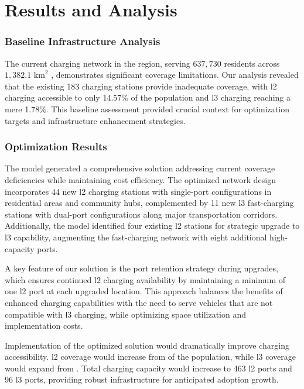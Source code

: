 \chapter{Results and Analysis}

\subsection*{Baseline Infrastructure Analysis}

The current charging network in the  region, serving $637,730$ residents \cite{statcan2021} across $1,382.1 \text{ km}^2$ \cite{statcan2021}, demonstrates significant coverage limitations. Our analysis revealed that the existing 183 charging stations \cite{ocm2024} provide inadequate coverage, with \gls{l2} charging accessible to only 14.57\% of the population and \gls{l3} charging reaching a mere 1.78\%. This baseline assessment provided crucial context for optimization targets and infrastructure enhancement strategies.

\subsection*{Optimization Results}

The  model generated a comprehensive solution addressing current coverage deficiencies while maintaining cost efficiency. The optimized network design incorporates 44 new \gls{l2} charging stations with single-port configurations in residential areas and community hubs, complemented by 11 new \gls{l3} fast-charging stations with dual-port configurations along major transportation corridors. Additionally, the model identified four existing \gls{l2} stations for strategic upgrade to \gls{l3} capability, augmenting the fast-charging network with eight additional high-capacity ports.

A key feature of our solution is the port retention strategy during upgrades, which ensures continued \gls{l2} charging availability by maintaining a minimum of one \gls{l2} port at each upgraded location. This approach balances the benefits of enhanced charging capabilities with the need to serve vehicles that are not compatible with \gls{l3} charging, while optimizing space utilization and implementation costs.

Implementation of the optimized solution would dramatically improve charging accessibility. \gls{l2} coverage would increase from  of the population, while \gls{l3} coverage would expand from . Total charging capacity would increase to 463 \gls{l2} ports and 96 \gls{l3} ports, providing robust infrastructure for anticipated  adoption growth.

